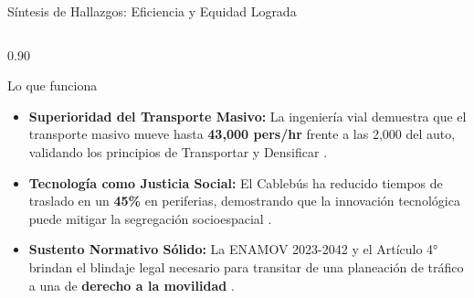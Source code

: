 \begin{frame}{Síntesis de Hallazgos: Eficiencia y Equidad Lograda}
  \begin{columns}[T]
    \begin{column}{0.90\textwidth}
      \begin{block}{Lo que funciona}
        \begin{itemize}
          \item \textbf{Superioridad del Transporte Masivo:} La ingeniería vial demuestra que el transporte masivo mueve hasta 
              \textbf{43,000 pers/hr} frente a las 2,000 del auto, validando los principios de Transportar y Densificar \cite{ITDP_Espacio}.
          \item \textbf{Tecnología como Justicia Social:} El Cablebús ha reducido tiempos de traslado en un \textbf{45\%} 
                en periferias, demostrando que la innovación tecnológica puede mitigar la segregación socioespacial \cite{SEDATU2023}.
          \item \textbf{Sustento Normativo Sólido:} La ENAMOV 2023-2042 y el Artículo 4° brindan el blindaje legal necesario para transitar 
                de una planeación de tráfico a una de \textbf{derecho a la movilidad} \cite{SEDATU2023,ITDP_Espacio}.
        \end{itemize}
      \end{block}
    \end{column}
  \end{columns}
\end{frame}

